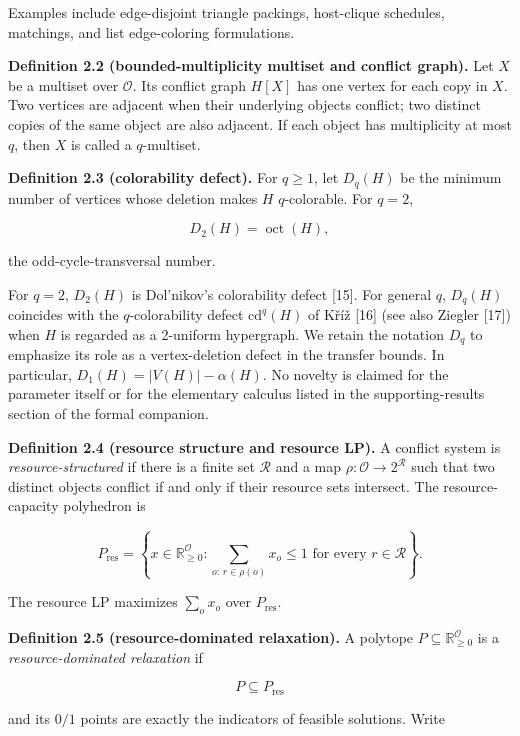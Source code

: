\documentclass[english,11pt,a4paper]{article}
\begin{document}
Examples include edge-disjoint triangle packings, host-clique schedules,
matchings, and list edge-coloring formulations.

\textbf{Definition 2.2 (bounded-multiplicity multiset and conflict
graph).} Let \(X\) be a multiset over \(\mathcal O\). Its conflict graph
\(H[X]\) has one vertex for each copy in \(X\). Two vertices are
adjacent when their underlying objects conflict; two distinct copies of
the same object are also adjacent. If each object has multiplicity at
most \(q\), then \(X\) is called a \(q\)-multiset.

\textbf{Definition 2.3 (colorability defect).} For \(q\ge1\), let
\(D_q(H)\) be the minimum number of vertices whose deletion makes \(H\)
\(q\)-colorable. For \(q=2\),

\[
D_2(H)=\operatorname{oct}(H),
\]

the odd-cycle-transversal number.

For \(q=2\), \(D_2(H)\) is Dol'nikov's colorability defect {[}15{]}. For
general \(q\), \(D_q(H)\) coincides with the \(q\)-colorability defect
\(\mathrm{cd}^q(H)\) of Kříž {[}16{]} (see also Ziegler {[}17{]}) when
\(H\) is regarded as a 2-uniform hypergraph. We retain the notation
\(D_q\) to emphasize its role as a vertex-deletion defect in the
transfer bounds. In particular, \(D_1(H)=|V(H)|-\alpha(H)\). No novelty
is claimed for the parameter itself or for the elementary calculus
listed in the supporting-results section of the formal companion.

\textbf{Definition 2.4 (resource structure and resource LP).} A conflict
system is \emph{resource-structured} if there is a finite set
\(\mathcal R\) and a map \(\rho:\mathcal O\to 2^{\mathcal R}\) such that
two distinct objects conflict if and only if their resource sets
intersect. The resource-capacity polyhedron is

\[
P_{\mathrm{res}}
=
\left\{
x\in\mathbb R_{\ge0}^{\mathcal O}:
\sum_{o:\,r\in\rho(o)}x_o\le1
\text{ for every }r\in\mathcal R
\right\}.
\]

The resource LP maximizes \(\sum_o x_o\) over \(P_{\mathrm{res}}\).

\textbf{Definition 2.5 (resource-dominated relaxation).} A polytope
\(P\subseteq\mathbb R_{\ge0}^{\mathcal O}\) is a
\emph{resource-dominated relaxation} if

\[
P\subseteq P_{\mathrm{res}}
\]

and its \(0/1\) points are exactly the indicators of feasible solutions.
Write
\end{document}

